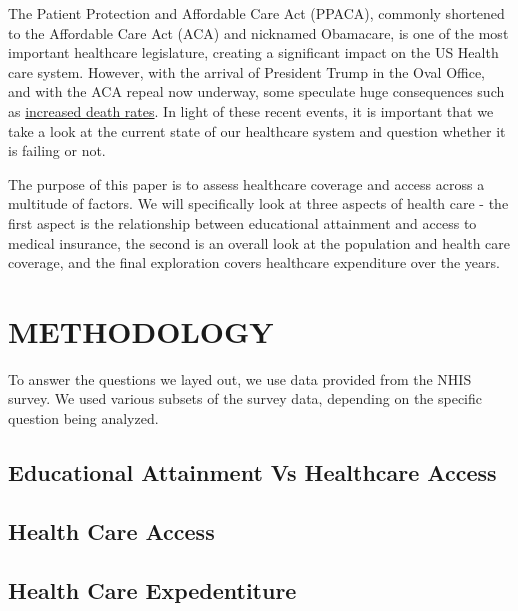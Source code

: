 \documentclass[10pt,]{article}
\begin{document}
The Patient Protection and Affordable Care Act (PPACA), commonly
shortened to the Affordable Care Act (ACA) and nicknamed Obamacare, is
one of the most important healthcare legislature, creating a significant
impact on the US Health care system. However, with the arrival of
President Trump in the Oval Office, and with the ACA repeal now
underway, some speculate huge consequences such as
\href{https://www.washingtonpost.com/posteverything/wp/2017/01/23/repealing-the-affordable-care-act-will-kill-more-than-43000-people-annually/?utm_term=.a2fbb24cd075}{increased
death rates}. In light of these recent events, it is important that we
take a look at the current state of our healthcare system and question
whether it is failing or not.

The purpose of this paper is to assess healthcare coverage and access
across a multitude of factors. We will specifically look at three
aspects of health care - the first aspect is the relationship between
educational attainment and access to medical insurance, the second is an
overall look at the population and health care coverage, and the final
exploration covers healthcare expenditure over the years.

\section{METHODOLOGY}\label{methodology}

To answer the questions we layed out, we use data provided from the NHIS
survey. We used various subsets of the survey data, depending on the
specific question being analyzed.

\subsection{\texorpdfstring{\textbf{Educational Attainment Vs Healthcare
Access}}{Educational Attainment Vs Healthcare Access}}\label{educational-attainment-vs-healthcare-access}

\subsection{\texorpdfstring{\textbf{Health Care
Access}}{Health Care Access}}\label{health-care-access}

\subsection{\texorpdfstring{\textbf{Health Care
Expedentiture}}{Health Care Expedentiture}}\label{health-care-expedentiture}
\end{document}
